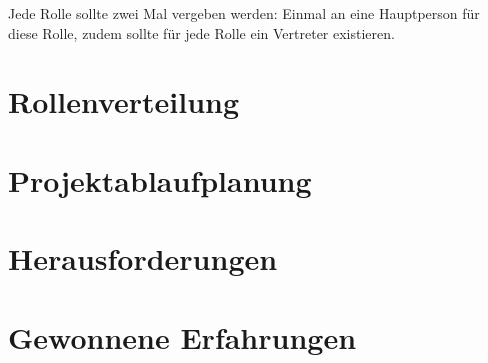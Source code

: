         Jede Rolle sollte zwei Mal vergeben werden: Einmal an eine Hauptperson
        für diese Rolle, zudem sollte für jede Rolle ein Vertreter existieren.

    \section{Rollenverteilung}

        \notAvailable{}

    \section{Projektablaufplanung}

        \notAvailable{}

    \section{Herausforderungen}

        \notAvailable{}

    \section{Gewonnene Erfahrungen}

        \notAvailable{}

